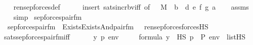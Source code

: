 \begin{isabellebody}
%
\isadelimproof
\ \ %
\endisadelimproof
%
\isatagproof
{}\isamarkupfalse%
\ ren{\isacharunderscore}{\kern0pt}sep{\isacharunderscore}{\kern0pt}forces{\isacharunderscore}{\kern0pt}def\ \isanewline
\ \ \ \isamarkupfalse%
\ {\isacharparenleft}{\kern0pt}insert\ sats{\isacharunderscore}{\kern0pt}incr{\isacharunderscore}{\kern0pt}bv{\isacharunderscore}{\kern0pt}iff\ {\isacharbrackleft}{\kern0pt}of\ {\isacharunderscore}{\kern0pt}\ {\isacharunderscore}{\kern0pt}\ M\ {\isacharunderscore}{\kern0pt}\ {\isachardoublequoteopen}{\isacharbrackleft}{\kern0pt}b{\isacharcomma}{\kern0pt}\ \ d{\isacharcomma}{\kern0pt}\ e{\isacharcomma}{\kern0pt}\ f{\isacharcomma}{\kern0pt}\ g{\isacharcomma}{\kern0pt}\ a{\isacharbrackright}{\kern0pt}{\isachardoublequoteclose}{\isacharbrackright}{\kern0pt}{\isacharparenright}{\kern0pt}\isanewline
\ \ \isamarkupfalse%
\ assms\isanewline
\ \ \isamarkupfalse%
\ simp%
\endisatagproof
{\isafoldproof}%
%
\isadelimproof
\isanewline
%
\endisadelimproof
\isanewline
{}\isamarkupfalse%
\ sep{\isacharunderscore}{\kern0pt}forces{\isacharunderscore}{\kern0pt}pair{\isacharunderscore}{\kern0pt}fm\ \ \isanewline
\ \ {\isachardoublequoteopen}sep{\isacharunderscore}{\kern0pt}forces{\isacharunderscore}{\kern0pt}pair{\isacharunderscore}{\kern0pt}fm{\isacharparenleft}{\kern0pt}{\isasymphi}{\isacharparenright}{\kern0pt}\ {\isasymequiv}\ Exists{\isacharparenleft}{\kern0pt}Exists{\isacharparenleft}{\kern0pt}And{\isacharparenleft}{\kern0pt}pair{\isacharunderscore}{\kern0pt}fm{\isacharparenleft}{\kern0pt}{}{\isacharcomma}{\kern0pt}\ {}{\isacharcomma}{\kern0pt}\ {}{\isacharparenright}{\kern0pt}{\isacharcomma}{\kern0pt}\ ren{\isacharunderscore}{\kern0pt}sep{\isacharunderscore}{\kern0pt}forces{\isacharparenleft}{\kern0pt}forcesHS{\isacharparenleft}{\kern0pt}{\isasymphi}{\isacharparenright}{\kern0pt}{\isacharparenright}{\kern0pt}{\isacharparenright}{\kern0pt}{\isacharparenright}{\kern0pt}{\isacharparenright}{\kern0pt}{\isachardoublequoteclose}\ \isanewline
\isanewline
{}\isamarkupfalse%
\ sats{\isacharunderscore}{\kern0pt}sep{\isacharunderscore}{\kern0pt}forces{\isacharunderscore}{\kern0pt}pair{\isacharunderscore}{\kern0pt}fm{\isacharunderscore}{\kern0pt}iff\ {\isacharcolon}{\kern0pt}\ \isanewline
\ \ \ {\isasymphi}\ y\ p\ env\isanewline
\ \ \ {\isachardoublequoteopen}{\isasymphi}\ {\isasymin}\ formula{\isachardoublequoteclose}\ {\isachardoublequoteopen}y\ {\isasymin}\ HS{\isachardoublequoteclose}\ {\isachardoublequoteopen}p\ {\isasymin}\ P{\isachardoublequoteclose}\ {\isachardoublequoteopen}env\ {\isasymin}\ list{\isacharparenleft}{\kern0pt}HS{\isacharparenright}{\kern0pt}{\isachardoublequoteclose}\ \ \isanewline

\end{isabellebody}
